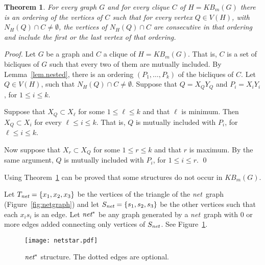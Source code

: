 \documentclass{article}
\newcommand{\net}{\emph{net}}
\newtheorem{theorem}{Theorem}
\begin{document}
\begin{theorem}\label{teo.KBm-clique-order}
  For every graph $G$ and for every clique $C$ of $H = KB_m(G)$ there is
  an  ordering  of the  vertices  of  $C$  such  that for  every  vertex
  $Q \in V(H)$, with $N_{H}(Q) \cap C \neq \emptyset$, the vertices
  of $N_{H}(Q) \cap C$ are consecutive in that ordering and include the
  first or the last vertex of that ordering.
\end{theorem}
\begin{proof}
  Let $G$ be a graph and $C$ a  clique of $H = KB_m(G)$. That is, $C$ is
  a set  of bicliques of  $G$ such that every  two of them  are mutually
  included.    By   Lemma~\ref{lem.nested},   there   is   an   ordering
  $(P_1, \ldots, P_k)$ of the bicliques  of $C$.  Let $Q \in V(H)$, such
  that $N_{H}(Q) \cap C \neq \emptyset$.   Suppose that $Q = X_QY_Q$ and
  $P_i= X_iY_i$, for $1 \leq i \leq k$.

  Suppose that $X_Q \subset X_{\ell}$ for  some $1 \leq \ell \leq k$ and
  that   $\ell$    is   minimum.    Then
  $X_Q \subset X_i$   for every $\ell \leq i \leq k$.
  That    is,   $Q$    is    mutually   included    with   $P_i$,    for
  $\ell \leq i \leq k$.

  Now suppose that $X_r \subset X_Q$ for some $1 \leq r \leq k$ and that
  $r$ is  maximum.  By  the same argument,  $Q$ is
  mutually included with $P_i$, for $1 \leq i \leq r$.
  \qed
\end{proof}

Using Theorem~\ref{teo.KBm-clique-order} can be proved that some structures
do not occur in $KB_m(G)$. 

Let $T_{\net} = \{x_1, x_2, x_3\}$ be the vertices of the triangle of the \net\ graph 
(Figure~\ref{fig:netgraph}) and let $S_{\net} = \{s_1, s_2, s_3\}$ be the other vertices 
such that each $x_is_i$ is an edge.
Let $\net^*$ be any graph generated by a \net\ graph with 
0  or more  edges  added  connecting only  vertices  of $S_{\net}$.  See
Figure~\ref{fig:netstar}.

\begin{figure}[htb]
  \centering
  \texttt{[image: netstar.pdf]}
  \caption{$\net^*$ structure. The dotted edges are optional.}
  \label{fig:netstar}
\end{figure}
\end{document}
